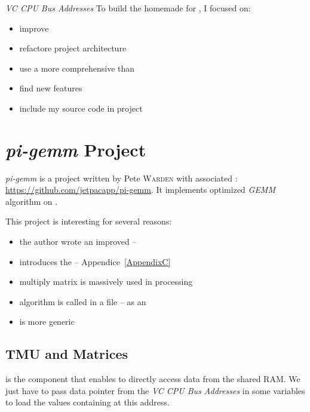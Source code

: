 \emph{VC CPU Bus Addresses}
To build the homemade  for \iBubble, I focused on:
\begin{itemize}
	\item improve 
	\item refactore project architecture
	\item use a more comprehensive  than 
	\item find new \vc{} features
	\item include my source code in  project
\end{itemize}


\section{\emph{pi-gemm} Project}

\emph{pi-gemm} \parencite{refPiGemm} is a project written by Pete \textsc{Warden} with associated : \url{https://github.com/jetpacapp/pi-gemm}. It implements optimized \emph{GEMM} algorithm on \vc.

This project is interesting for several reasons:
\begin{itemize}
	\item the author wrote an improved  -- 
	\item {} introduces the  -- Appendice~\ref{AppendixC}
	\item multiply matrix is massively used in  processing
	\item {} algorithm is called in a  file -- as an 
	\item {}  is more generic
\end{itemize}


\subsection{TMU and Matrices}\label{Matrices}

 is the \vc{} component that enables \qpu{} to directly access data from the shared RAM. We just have to pass data pointer from the \emph{VC CPU Bus Addresses} in some  variables to load the values containing at this address.

